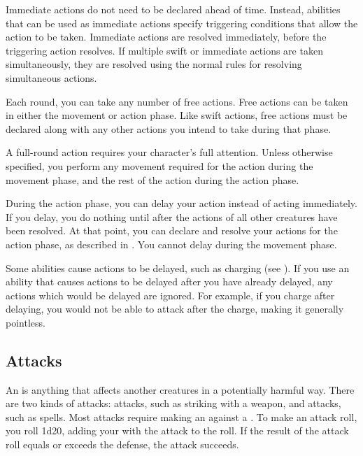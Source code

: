         Immediate actions do not need to be declared ahead of time.
        Instead, abilities that can be used as immediate actions specify triggering conditions that allow the action to be taken.
        Immediate actions are resolved immediately, before the triggering action resolves.
        If multiple swift or immediate actions are taken simultaneously, they are resolved using the normal rules for resolving simultaneous actions.

        \label{Free Actions} Each round, you can take any number of free actions.
        Free actions can be taken in either the movement or action phase.
        Like swift actions, free actions must be declared along with any other actions you intend to take during that phase.

         A full-round action requires your character's full attention.
        Unless otherwise specified, you perform any movement required for the action during the movement phase, and the rest of the action during the action phase.

        \label{Delaying}
        During the action phase, you can delay your action instead of acting immediately.
        If you delay, you do nothing until after the actions of all other creatures have been resolved.
        At that point, you can declare and resolve your actions for the action phase, as described in .
        You cannot delay during the movement phase.

        Some abilities cause actions to be delayed, such as charging (see ).
        If you use an ability that causes actions to be delayed after you have already delayed, any actions which would be delayed are ignored.
        For example, if you charge after delaying, you would not be able to attack after the charge, making it generally pointless.

    \subsection{Attacks}\label{Attacks}
        An  is anything that affects another creatures in a potentially harmful way.
        There are two kinds of attacks:  attacks, such as striking with a weapon, and  attacks, such as spells.
        Most attacks require making an  against a .
        To make an attack roll, you roll 1d20, adding your  with the attack to the roll.
        If the result of the attack roll equals or exceeds the defense, the attack succeeds.

